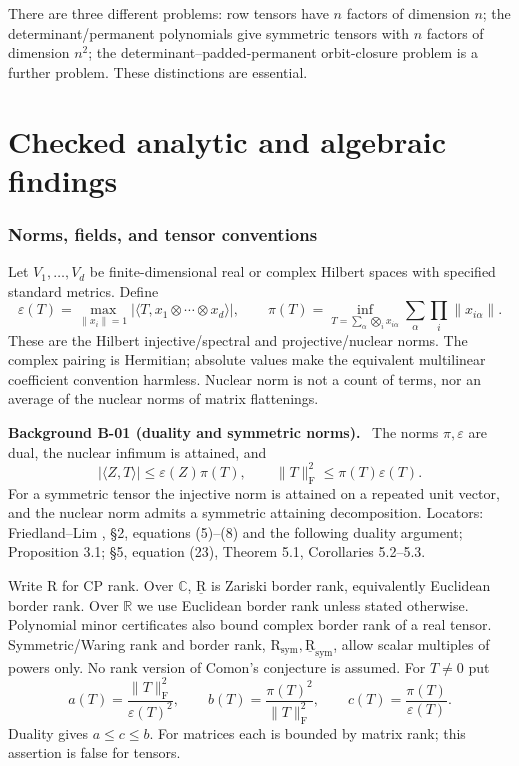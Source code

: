 \documentclass[11pt]{article}
\newcommand{\R}{\mathbb R}\newcommand{\C}{\mathbb C}
\newcommand{\BR}{\underline{\mathrm R}}\newcommand{\TR}{\mathrm R}
\newcommand{\SR}{\mathrm R_{\mathrm{sym}}}
\newcommand{\BSR}{\underline{\mathrm R}_{\mathrm{sym}}}
\newcommand{\HS}[1]{\lVert #1\rVert_{\mathrm F}}
\newcommand{\eps}{\varepsilon}
\newcommand{\abs}[1]{\lvert#1\rvert}
\newenvironment{background}[2]{\par\medskip\noindent\textbf{Background #1 (#2).}\ }{\par\medskip}
\begin{document}
There are three different problems: row tensors have $n$ factors of
dimension $n$; the determinant/permanent polynomials give symmetric tensors
with $n$ factors of dimension $n^2$; the determinant--padded-permanent
orbit-closure problem is a further problem. These distinctions are essential.

\part{Checked analytic and algebraic findings}
\section{Norms, fields, and tensor conventions}
Let $V_1,\ldots,V_d$ be finite-dimensional real or complex Hilbert spaces
with specified standard metrics. Define
\[
 \eps(T)=\max_{\|x_i\|=1}
       \abs{\langle T,x_1\otimes\cdots\otimes x_d\rangle},\qquad
 \pi(T)=\inf_{T=\sum_\alpha\bigotimes_i x_{i\alpha}}
             \sum_\alpha\prod_i\|x_{i\alpha}\|.
\]
These are the Hilbert injective/spectral and projective/nuclear norms.
The complex pairing is Hermitian; absolute values make the equivalent
multilinear coefficient convention harmless. Nuclear norm is not a count
of terms, nor an average of the nuclear norms of matrix flattenings.

\begin{background}{B-01}{duality and symmetric norms}
The norms $\pi,\eps$ are dual, the nuclear infimum is attained, and
\begin{equation}\label{eq:duality}
 \abs{\langle Z,T\rangle}\leq\eps(Z)\pi(T),\qquad
 \HS T^2\leq\pi(T)\eps(T).
\end{equation}
For a symmetric tensor the injective norm is attained on a repeated unit
vector, and the nuclear norm admits a symmetric attaining decomposition.
Locators: Friedland--Lim \cite{FL}, \S2, equations (5)--(8) and the
following duality argument; Proposition 3.1; \S5, equation (23),
Theorem 5.1, Corollaries 5.2--5.3.
\end{background}

Write $\TR$ for CP rank. Over $\C$, $\BR$ is Zariski border rank,
equivalently Euclidean border rank. Over $\R$ we use Euclidean border
rank unless stated otherwise. Polynomial minor certificates also bound
complex border rank of a real tensor. Symmetric/Waring rank and border
rank, $\SR,\BSR$, allow scalar multiples of powers only. No rank version
of Comon's conjecture is assumed.
For $T\ne0$ put
\begin{equation}\label{eq:ratios}
 a(T)=\frac{\HS T^2}{\eps(T)^2},\qquad
 b(T)=\frac{\pi(T)^2}{\HS T^2},\qquad
 c(T)=\frac{\pi(T)}{\eps(T)}.
\end{equation}
Duality gives $a\leq c\leq b$. For matrices each is bounded by matrix
rank; this assertion is false for tensors.
\end{document}
